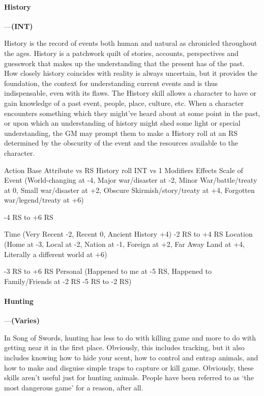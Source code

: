 \documentclass[oneside,11pt,english]{book}
\begin{document}
 

 

\paragraph{\label{skill:History}History}---\quad\textbf{(INT) }\par
History is the record of events both human and natural as chronicled throughout the ages. History is a patchwork quilt of stories, accounts, perspectives and guesswork that makes up the understanding that the present has of the past. How closely history coincides with reality is always uncertain, but it provides the foundation, the context for understanding current events and is thus indispensable, even with its flaws. The History skill allows a character to have or gain knowledge of a past event, people, place, culture, etc. When a character encounters something which they might’ve heard about at some point in the past, or upon which an understanding of history might shed some light or special understanding, the GM may prompt them to make a History roll at an RS determined by the obscurity of the event and the resources available to the character.


Action Base 
Attribute vs 
RS 
History roll INT vs 1 
Modifiers Effects 
Scale of Event (World-changing at -4, Major war/disaster at -2, Minor War/battle/treaty 
at 0, Small war/disaster at +2, Obscure Skirmish/story/treaty at +4, Forgotten 
war/legend/treaty at +6) 

-4 RS to +6 
RS 

Time (Very Recent -2, Recent 0, Ancient History +4) -2 RS to +4 
RS 
Location (Home at -3, Local at -2, Nation at -1, Foreign at +2, Far Away Land at +4, 
Literally a different world at +6) 

-3 RS to +6 
RS 
Personal (Happened to me at -5 RS, Happened to Family/Friends at -2 RS -5 RS to -2 
RS)

 

 

\paragraph{\label{skill:Hunting}Hunting}---\quad\textbf{(Varies) }\par
In Song of Swords, hunting has less to do with killing game and more to do with getting near it in the first place. Obviously, this includes tracking, but it also includes knowing how to hide your scent, how to control and entrap animals, and how to make and disguise simple traps to capture or kill game. Obviously, these skills aren’t useful just for hunting animals. People have been referred to as ‘the most dangerous game’ for a reason, after all.
\end{document}

